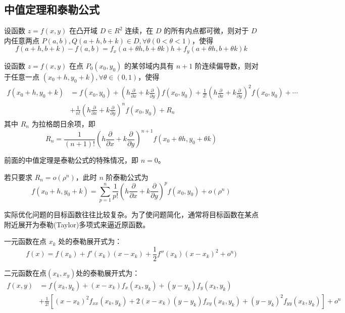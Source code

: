 \subsection{中值定理和泰勒公式}

\begin{theorem}[拉格朗日中值定理]
    设函数 $z=f(x,y)$ 在凸开域 $D\in R^2$ 连续，在 $D$ 的所有内点都可微，则对于 $D$ 内任意两点 $P(a,b),Q(a+h,b+k)\in D, \forall\theta(0<\theta<1)$，使得
    \[
        f(a+h,b+k)-f(a,b)=f_x(a+\theta h,b+\theta k)h+f_y(a+\theta h,b+\theta k)k
    \]
\end{theorem}

\begin{theorem}[泰勒公式]
    设函数 $z=f(x,y)$ 在点 $P_0(x_0,y_0)$ 的某邻域内具有 $n+1$ 阶连续偏导数，则对于任意一点 $(x_0+h,y_0+k),\forall \theta \in (0,1)$，使得
    \[
        \begin{aligned}
            f(x_0+h,y_0+k) & =f(x_0,y_0)+(h\frac{\partial}{\partial x}+k\frac{\partial}{\partial y})f(x_0,y_0)+\frac{1}{2!}(h\frac{\partial}{\partial x}+k\frac{\partial}{\partial y})^2f(x_0,y_0)+\cdots \\
                           & +\frac{1}{n!}(h\frac{\partial}{\partial x}+k\frac{\partial}{\partial y})^nf(x_0,y_0)+R_n
        \end{aligned}
    \]
    其中 $R_n$ 为拉格朗日余项，即
    \[
        R_n=\frac{1}{(n+1)!}(h\frac{\partial}{\partial x}+k\frac{\partial}{\partial y})^{n+1}f(x_0+\theta h,y_0+\theta k)
    \]
\end{theorem}

前面的中值定理是泰勒公式的特殊情况，即 $n=0$。

若只要求 $R_n=o(\rho^n)$，此时 $n$ 阶泰勒公式为
\[
    f(x_0+h,y_0+k)=\sum_{p=1}^n\frac{1}{p!}(h\frac{\partial}{\partial x}+k\frac{\partial}{\partial y})^pf(x_0,y_0)+o(\rho^n)
\]

实际优化问题的目标函数往往比较复杂。为了使问题简化，通常将目标函数在某点附近展开为泰勒(Taylor)多项式来逼近原函数。

一元函数在点 $x_k$ 处的泰勒展开式为：
\[
    f(x)=f(x_k)+f'(x_k)(x-x_k)+\frac{1}{2}f''(x_k)(x-x_k)^2+o^n)
\]

二元函数在点$(x_k,x_y)$处的泰勒展开式为：
\[
    \begin{aligned}
        f(x,y) & =f(x_k,y_k)+(x-x_k)f_x(x_k,y_k)+(y-y_k)f_y(x_k,y_k)                                                 \\
               & +\frac{1}{2!}[(x-x_k)^2f_{xx}(x_k,y_k)+2(x-x_k)(y-y_k)f_{xy}(x_k,y_k)+(y-y_k)^2f_{yy}(x_k,y_k)]+o^n
    \end{aligned}
\]

